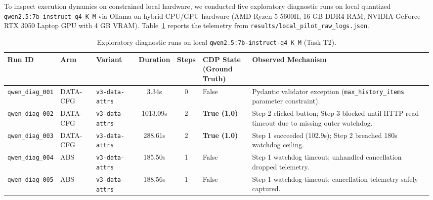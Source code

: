\documentclass[11pt,a4paper]{article}
\begin{document}
To inspect execution dynamics on constrained local hardware, we conducted five exploratory diagnostic runs on local quantized \texttt{qwen2.5:7b-instruct-q4\_K\_M} via Ollama on hybrid CPU/GPU hardware (AMD Ryzen 5 5600H, 16 GB DDR4 RAM, NVIDIA GeForce RTX 3050 Laptop GPU with 4 GB VRAM). Table~\ref{tab:qwen_runs} reports the telemetry from \texttt{results/local\_pilot\_raw\_logs.json}.

\begin{table}[t]
\centering
\small
\setlength{\tabcolsep}{4pt}
\caption{Exploratory diagnostic runs on local \texttt{qwen2.5:7b-instruct-q4\_K\_M} (Task T2).}
\label{tab:qwen_runs}
\begin{tabularx}{\textwidth}{>{\raggedright\arraybackslash}p{2.6cm} >{\raggedright\arraybackslash}p{1.8cm} >{\raggedright\arraybackslash}p{2.1cm} cc >{\centering\arraybackslash}p{2.0cm} >{\raggedright\arraybackslash}X}
\toprule
\textbf{Run ID} & \textbf{Arm} & \textbf{Variant} & \textbf{Duration} & \textbf{Steps} & \shortstack{\textbf{CDP State} \\ \scriptsize(Ground Truth)} & \textbf{Observed Mechanism} \\
\midrule
\texttt{qwen\_diag\_001} & \textsc{DATA-CFG} & \texttt{v3-data-attrs} & 3.34s    & 0 & False      & Pydantic validator exception (\texttt{max\_history\_items} parameter constraint). \\
\texttt{qwen\_diag\_002} & \textsc{DATA-CFG} & \texttt{v3-data-attrs} & 1013.09s & 2 & \textbf{True (1.0)} & Step 2 clicked button; Step 3 blocked until HTTP read timeout due to missing outer watchdog. \\
\texttt{qwen\_diag\_003} & \textsc{DATA-CFG} & \texttt{v3-data-attrs} & 288.61s  & 2 & \textbf{True (1.0)} & Step 1 succeeded (102.9s); Step 2 breached 180s watchdog ceiling. \\
\texttt{qwen\_diag\_004} & \textsc{ABS}      & \texttt{v3-data-attrs} & 185.50s  & 1 & False      & Step 1 watchdog timeout; unhandled cancellation dropped telemetry. \\
\texttt{qwen\_diag\_005} & \textsc{ABS}      & \texttt{v3-data-attrs} & 188.56s  & 1 & False      & Step 1 watchdog timeout; cancellation telemetry safely captured. \\
\bottomrule
\end{tabularx}
\end{table}
\end{document}
